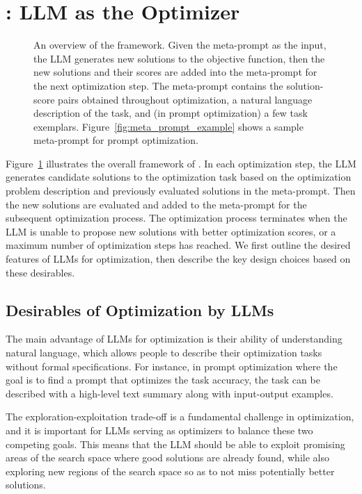 \section{\name{}: LLM as the Optimizer}
\label{sec:approach}

\begin{figure}
\centering
{}
\caption{An overview of the \name{} framework. Given the meta-prompt as the input, the LLM generates new solutions to the objective function, then the new solutions and their scores are added into the meta-prompt for the next optimization step. The meta-prompt contains the solution-score pairs obtained throughout optimization, a natural language description of the task, and (in prompt optimization) a few task exemplars. Figure~\ref{fig:meta_prompt_example} shows a sample meta-prompt for prompt optimization.
}
\vspace{-.5em}
\label{fig:overview}
\end{figure}

Figure~\ref{fig:overview} illustrates the overall framework of \name{}. 
In each optimization step, the LLM generates candidate solutions to the optimization task based on the optimization problem description and previously evaluated solutions in the meta-prompt. 
Then the new solutions are evaluated and added to the meta-prompt for the subsequent optimization process. 
The optimization process terminates when the LLM is unable to propose new solutions with better optimization scores, or a maximum number of optimization steps has reached. 
We first outline the desired features of LLMs for optimization, then describe the key design choices based on these desirables.

\subsection{Desirables of Optimization by LLMs}

 The main advantage of LLMs for optimization is their ability of understanding natural language, which allows people to describe their optimization tasks without formal specifications. 
For instance, in prompt optimization where the goal is to find a prompt that optimizes the task accuracy, the task can be described with a high-level text summary along with input-output examples.

 The exploration-exploitation trade-off is a fundamental challenge in optimization, and it is important for LLMs serving as optimizers to balance these two competing goals. 
This means that the LLM should be able to exploit promising areas of the search space where good solutions are already found, while also exploring new regions of the search space so as to not miss potentially better solutions.

